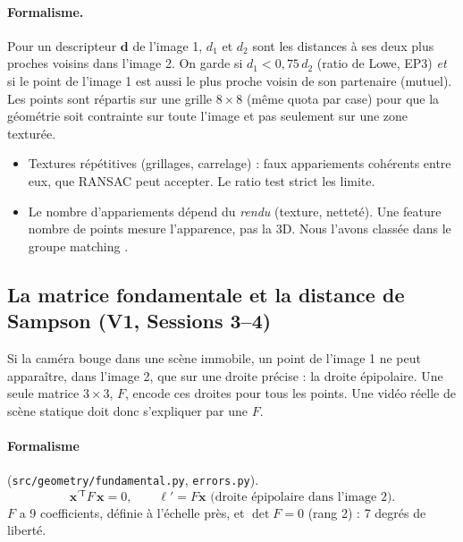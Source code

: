 \documentclass[11pt,a4paper]{article}
\newcommand{\x}{\mathbf{x}}
\begin{document}
\paragraph{Formalisme.} Pour un descripteur $\mathbf d$ de l'image 1, $d_1$ et $d_2$ sont les distances
à ses deux plus proches voisins dans l'image 2. On garde si $d_1<0{,}75\,d_2$ (ratio de Lowe, EP3)
\emph{et} si le point de l'image 1 est aussi le plus proche voisin de son partenaire (mutuel). Les
points sont répartis sur une grille $8\times8$ (même quota par case) pour que la géométrie soit
contrainte sur toute l'image et pas seulement sur une zone texturée.

\begin{piege}
\begin{itemize}
  \item Textures répétitives (grillages, carrelage) : faux appariements cohérents entre eux, que
        RANSAC peut accepter. Le ratio test strict les limite.
  \item Le nombre d'appariements dépend du \emph{rendu} (texture, netteté). Une feature \og nombre de
        points \fg{} mesure l'apparence, pas la 3D. Nous l'avons classée dans le groupe \og matching \fg.
\end{itemize}
\end{piege}

\subsection{La matrice fondamentale et la distance de Sampson (V1, Sessions 3--4)}

\begin{intuition}
Si la caméra bouge dans une scène immobile, un point de l'image 1 ne peut apparaître, dans l'image 2,
que sur une droite précise : la droite épipolaire. Une seule matrice $3\times 3$, $F$, encode ces
droites pour tous les points. Une vidéo réelle de scène statique doit donc s'expliquer par une $F$.
\end{intuition}

\paragraph{Formalisme} (\texttt{src/geometry/fundamental.py}, \texttt{errors.py}).
\[ \x^{\prime\mathsf{T}} F\,\x = 0,\qquad \boldsymbol\ell' = F\x \text{ (droite épipolaire dans l'image 2)}. \]
$F$ a 9 coefficients, définie à l'échelle près, et $\det F=0$ (rang 2) : 7 degrés de liberté.
\end{document}

